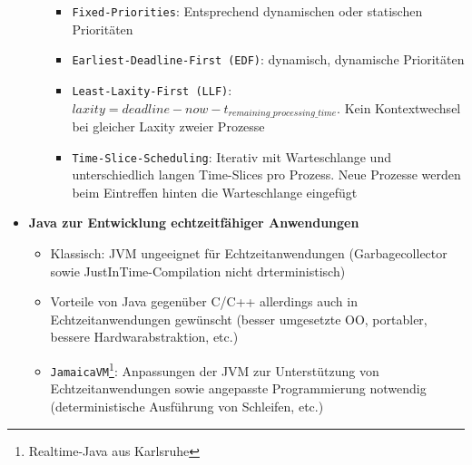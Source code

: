 \begin{itemize}
\begin{itemize}
\begin{itemize}
			\item \texttt{Fixed-Priorities}: Entsprechend dynamischen oder statischen Prioritäten
			\item \texttt{Earliest-Deadline-First (EDF)}: dynamisch, dynamische Prioritäten
			\item \texttt{Least-Laxity-First (LLF)}: \(laxity = deadline-now-t_{remaining\_processing\_time}\). Kein Kontextwechsel bei gleicher Laxity zweier Prozesse
			\item \texttt{Time-Slice-Scheduling}: Iterativ mit Warteschlange und unterschiedlich langen Time-Slices pro Prozess. Neue Prozesse werden beim Eintreffen hinten die Warteschlange eingefügt
		\end{itemize}
	\end{itemize}
	\item \textbf{Java zur Entwicklung echtzeitfähiger Anwendungen}
	\begin{itemize}
		\item Klassisch: JVM ungeeignet für Echtzeitanwendungen (Garbagecollector sowie JustInTime-Compilation nicht drterministisch)
		\item Vorteile von Java gegenüber C/C++ allerdings auch in Echtzeitanwendungen gewünscht (besser umgesetzte OO, portabler, bessere Hardwarabstraktion, etc.)
		\item \texttt{JamaicaVM}\footnote{Realtime-Java aus Karlsruhe}: Anpassungen der JVM zur Unterstützung von Echtzeitanwendungen sowie angepasste Programmierung notwendig (deterministische Ausführung von Schleifen, etc.)
	\end{itemize}
\end{itemize}


